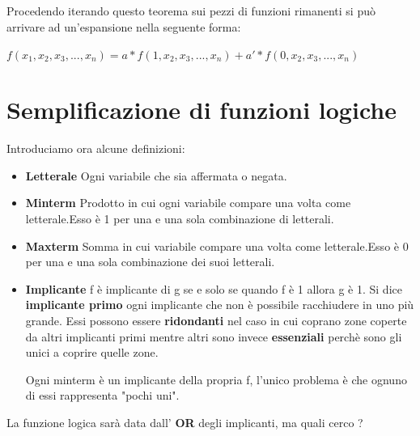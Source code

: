 \documentclass[a4paper]{book}
\begin{document}
\paragraph*{}
Procedendo iterando questo teorema sui pezzi di funzioni rimanenti si può arrivare ad un'espansione nella seguente forma:


\(f({x_1},{x_2},{x_3},...,{x_n})=a*f(1,{x_2},{x_3},...,{x_n})+a'*f(0,{x_2},{x_3},...,{x_n})\)

\newpage

\chapter{Semplificazione di funzioni logiche}
Introduciamo ora alcune definizioni:\\
\begin{itemize}
\item\textbf{Letterale}
Ogni variabile che sia affermata o negata.\\
\item\textbf{Minterm}
Prodotto in cui ogni variabile compare una volta come letterale.\newline Esso è 1 per una e una sola combinazione di letterali.\\
\item\textbf{Maxterm}
Somma in cui variabile compare una volta come letterale.\newline Esso è 0 per una e una sola combinazione dei suoi letterali.\\
\item\textbf{Implicante}
f è implicante di g se e solo se quando f è 1 allora g è 1.
\vspace{\baselineskip}
\newline Si dice \textbf{implicante primo} ogni implicante che non è possibile racchiudere in uno più grande.
Essi possono essere \textbf{ridondanti} nel caso in cui coprano zone coperte da altri implicanti primi mentre altri sono invece \textbf{essenziali} perchè sono gli unici a coprire quelle zone.

\vspace{\baselineskip}

Ogni minterm è un implicante della propria f, l'unico problema è che ognuno di essi rappresenta "pochi uni".\newline\break
\end{itemize}



\newpage
La funzione logica sarà data dall' \textbf{OR} degli implicanti, ma quali cerco ?
\vspace{\baselineskip}
\end{document}
